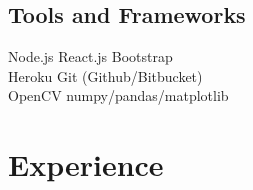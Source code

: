 \documentclass[]{deedy-resume-openfont}
\begin{document}
\begin{minipage}[t]{0.33\textwidth}
\subsection{Tools and Frameworks}
Node.js \textbullet{}   React.js \textbullet{} 
Bootstrap \textbullet{} \\
Heroku \textbullet{} 
Git (Github/Bitbucket) \\
OpenCV \textbullet numpy/pandas/matplotlib

\sectionsep




%
%

\end{minipage} 
\hfill
\begin{minipage}[t]{0.66\textwidth} 


\section{Experience}



\end{minipage}
\end{document}
